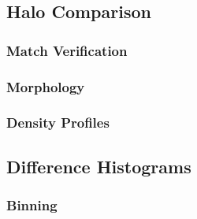 \subsection{Halo Comparison}
\label{subsec:halo_comparison}



\subsubsection{Match Verification}
\label{subsubsec:match_verification}



\subsubsection{Morphology}
\label{subsubsec:morphology}



\subsubsection{Density Profiles}
\label{subsubsec:density_profiles}




\subsection{Difference Histograms}
\label{subsec:difference_histograms}



\subsubsection{Binning}
\label{subsubsec:binning}



